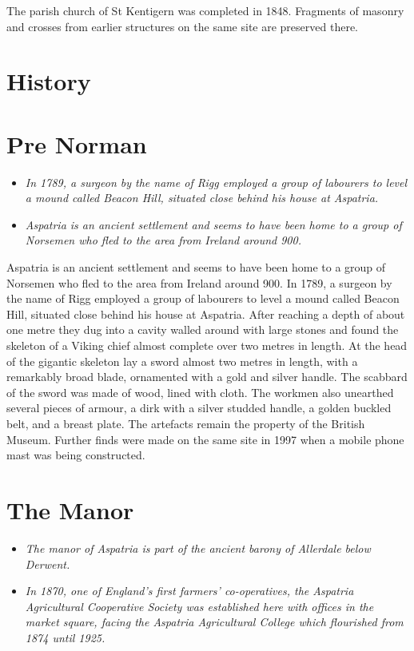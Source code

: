 The parish church of St Kentigern was completed in 1848. Fragments of
masonry and crosses from earlier structures on the same site are
preserved there.

\section{History}\label{history}

\section{Pre Norman}\label{pre-norman}

\begin{itemize}
\item
  \emph{In 1789, a surgeon by the name of Rigg employed a group of
  labourers to level a mound called Beacon Hill, situated close behind
  his house at Aspatria.}
\item
  \emph{Aspatria is an ancient settlement and seems to have been home to
  a group of Norsemen who fled to the area from Ireland around 900.}
\end{itemize}

Aspatria is an ancient settlement and seems to have been home to a group
of Norsemen who fled to the area from Ireland around 900. In 1789, a
surgeon by the name of Rigg employed a group of labourers to level a
mound called Beacon Hill, situated close behind his house at Aspatria.
After reaching a depth of about one metre they dug into a cavity walled
around with large stones and found the skeleton of a Viking chief almost
complete over two metres in length. At the head of the gigantic skeleton
lay a sword almost two metres in length, with a remarkably broad blade,
ornamented with a gold and silver handle. The scabbard of the sword was
made of wood, lined with cloth. The workmen also unearthed several
pieces of armour, a dirk with a silver studded handle, a golden buckled
belt, and a breast plate. The artefacts remain the property of the
British Museum. Further finds were made on the same site in 1997 when a
mobile phone mast was being constructed.

\section{The Manor}\label{the-manor}

\begin{itemize}
\item
  \emph{The manor of Aspatria is part of the ancient barony of Allerdale
  below Derwent.}
\item
  \emph{In 1870, one of England's first farmers' co-operatives, the
  Aspatria Agricultural Cooperative Society was established here with
  offices in the market square, facing the Aspatria Agricultural College
  which flourished from 1874 until 1925.}
\end{itemize}

